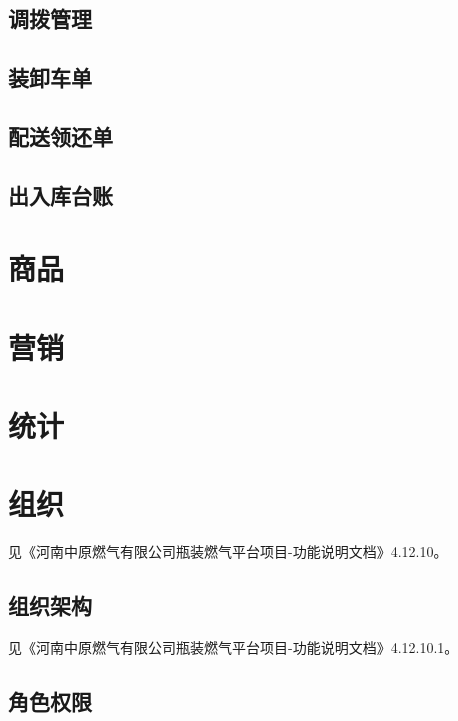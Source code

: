 \documentclass[UTF8]{ctexart}
\begin{document}
\subsection{调拨管理}




\subsection{装卸车单}




\subsection{配送领还单}




\subsection{出入库台账}





\section{商品}

\section{营销}

\section{统计}

\section{组织}

见《河南中原燃气有限公司瓶装燃气平台项目-功能说明文档》4.12.10。

\subsection{组织架构}

见《河南中原燃气有限公司瓶装燃气平台项目-功能说明文档》4.12.10.1。

\subsection{角色权限}
\end{document}
